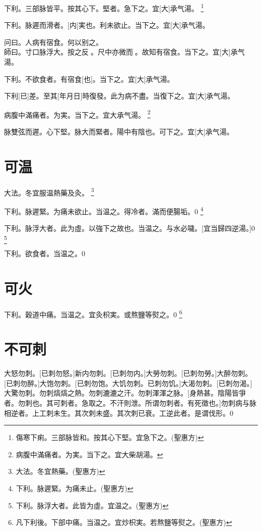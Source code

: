 \documentclass[oneside,b4paper]{ctexbook}
\begin{document}
\begin{flushleft}
下利。三部脉皆平。按其心下。堅者。急下之。宜[大]承气湯。
\footnote{傷寒下痢。三部脉皆和。按其心下堅。宜急下之。(聖惠方)}

下利。脉遲而滑者。[内]実也。利未欲止。当下之。宜[大]承气湯。

问曰。人病有宿食。何以别之。\\
師曰。寸口脉浮大。按之反{𬈧}。尺中亦微而{𬈧}。故知有宿食。当下之。宜[大]承气湯。

下利。不欲食者。有宿食[也]。当下之。宜[大]承气湯。

下利[已]差。至其[年月日]時復發。此为病不盡。当復下之。宜[大]承气湯。

病腹中滿痛者。为実。当下之。宜大承气湯。
\footnote{病腹中滿痛者。为実。当下之。宜大柴胡湯。}

脉雙弦而遲。心下堅。脉大而緊者。陽中有陰也。可下之。宜[大]承气湯。

\section{可温}

大法。冬宜服温熱藥及灸。
\footnote{大法。冬宜熱藥。(聖惠方)}

下利。脉遲緊。为痛未欲止。当温之。得冷者。滿而便腸垢。0
\footnote{下利。脉遲緊。为痛未止。(聖惠方)}

下利。脉浮大者。此为虛。以強下之故也。当温之。与水必噦。[宜当歸四逆湯。]0
\footnote{下利。脉浮大者。此皆为虛。宜温之。(聖惠方)}

下利。欲食者。当温之。0

\section{可火}

下利。穀道中痛。当温之。宜灸枳実。或熬鹽等熨之。0
\footnote{凡下利後。下部中痛。当温之。宜炒枳実。若熬鹽等熨之。(聖惠方)}

\section{不可刺}

大怒勿刺。[已刺勿怒。]新内勿刺。[已刺勿内。]大勞勿刺。[已刺勿勞。]大醉勿刺。[已刺勿醉。]大饱勿刺。[已刺勿饱。大饥勿刺。已刺勿饥。]大渴勿刺。[已刺勿渴。]大驚勿刺。勿刺熇熇之熱。勿刺漉漉之汗。勿刺渾渾之脉。[身熱甚。陰陽皆爭者。勿刺也。其可刺者。急取之。不汗則泄。所谓勿刺者。有死徵也。]勿刺病与脉相逆者。上工刺未生。其次刺未盛。其次刺已衰。工逆此者。是谓伐形。0


\end{flushleft}
\end{document}
